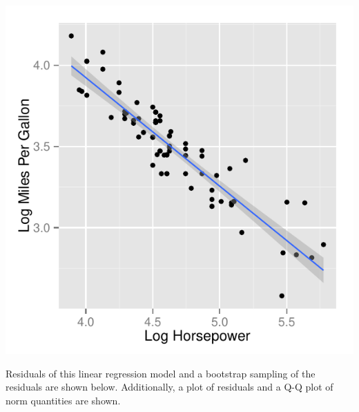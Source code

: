\documentclass{article}\usepackage[]{graphicx}\usepackage[]{color}
\makeatletter
\def\maxwidth{ %
  \ifdim\Gin@nat@width>\linewidth
    \linewidth
  \else
    \Gin@nat@width
  \fi
}
\newenvironment{knitrout}{}{} %
\makeatother
\begin{document}
\begin{knitrout}
\color{fgcolor}

{\centering \includegraphics[width=\maxwidth]{figure/1bplot-1} 

}



\end{knitrout}

Residuals of this linear regression model and a bootstrap sampling of the residuals are shown below.  Additionally, a plot of residuals and a Q-Q plot of norm quantities are shown.
\end{document}
